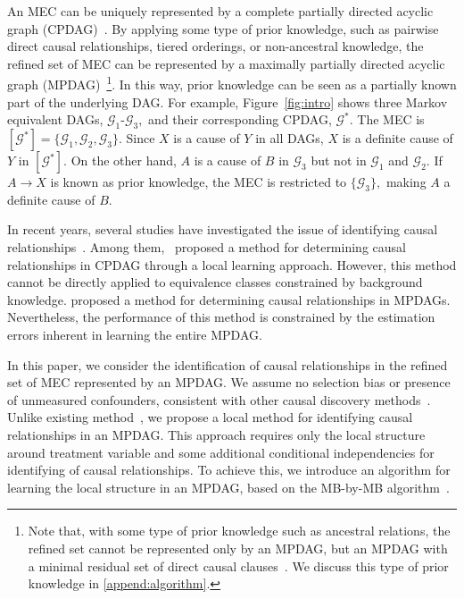 \documentclass{article}
\begin{document}
An MEC can be uniquely represented by a complete partially directed acyclic graph (CPDAG)~\citep{meek1995causal, andersson1997characterization, spirtes2000causation, chickering2002learning}. 
By applying some type of prior knowledge, such as pairwise direct causal relationships, tiered orderings, or non-ancestral knowledge, the refined set of MEC can be represented by a maximally partially directed acyclic graph (MPDAG)~\citep{meek1995causal,fang2020ida,fang2022representation, bang2023we}\footnote{Note that, with some type of prior knowledge such as ancestral relations, the refined set cannot be represented only by an MPDAG, but an MPDAG with a minimal residual set of direct causal clauses~\citep{fang2022representation}. We discuss this type of prior knowledge in \ref{append:algorithm}.}.
In this way, prior knowledge can be seen as a partially known part of the underlying DAG.
For example, Figure~\ref{fig:intro} shows three Markov equivalent DAGs, $\mathcal{G}_1$-$\mathcal{G}_3,$ and their corresponding CPDAG, $\mathcal{G}^*.$ The MEC is $[\mathcal{G}^*]=\{\mathcal{G}_1,\mathcal{G}_2,\mathcal{G}_3\}.$ Since $X$ is a cause of $Y$ in all DAGs, $X$ is a definite cause of $Y$ in $[\mathcal{G}^*].$ On the other hand, $A$ is a cause of $B$ in $\mathcal{G}_3$ but not in $\mathcal{G}_1$ and $\mathcal{G}_2.$ If $A\to X$ is known as prior knowledge, the MEC is restricted to $\{\mathcal{G}_3\},$ making $A$ a definite cause of $B$.

In recent years, several studies have investigated the issue of identifying causal relationships~\citep{roumpelaki2016marginal,mooij2020constraint,fang2022local,zuo2022counterfactual}. Among them,~\citet{fang2022local} proposed a method for determining causal relationships in CPDAG through a local learning approach. However, this method cannot be directly applied to equivalence classes constrained by background knowledge. \citet{zuo2022counterfactual} proposed a method for determining causal relationships in MPDAGs. Nevertheless, the performance of this method is constrained by the estimation errors inherent in learning the entire MPDAG.

In this paper, we consider the identification of causal relationships in the refined set of MEC represented by an MPDAG.
We assume no selection bias or presence of unmeasured confounders, consistent with other causal discovery methods~\citep{liu2020local, fang2022local, zuo2022counterfactual}.
Unlike existing method~\citep{zuo2022counterfactual}, we propose a local method for identifying causal relationships in an MPDAG. This approach requires only the local structure around treatment variable and some additional conditional independencies for identifying of causal relationships.
To achieve this, we introduce an algorithm for learning the local structure in an MPDAG, based on the MB-by-MB algorithm~\citep{wang2014discovering, xie2024local}.
\end{document}
